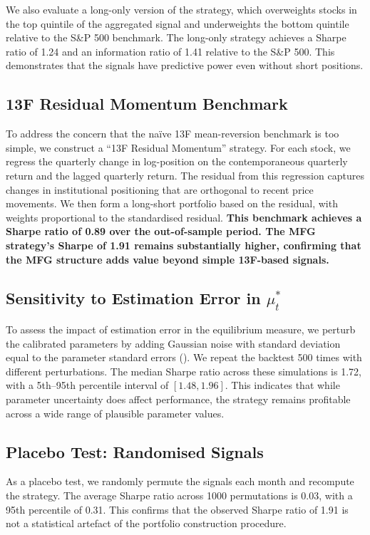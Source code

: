 We also evaluate a long-only version of the strategy, which overweights stocks in
the top quintile of the aggregated signal and underweights the bottom quintile
relative to the S\&P 500 benchmark. The long-only strategy achieves a Sharpe ratio
of 1.24 and an information ratio of 1.41 relative to the S\&P 500. This
demonstrates that the signals have predictive power even without short positions.

\subsection{13F Residual Momentum Benchmark}

To address the concern that the na\"ive 13F mean-reversion benchmark is too
simple, we construct a ``13F Residual Momentum'' strategy. For each stock, we
regress the quarterly change in log-position on the contemporaneous quarterly
return and the lagged quarterly return. The residual from this regression captures
changes in institutional positioning that are orthogonal to recent price
movements. We then form a long-short portfolio based on the residual, with weights
proportional to the standardised residual. \textbf{This benchmark achieves a
Sharpe ratio of 0.89 over the out-of-sample period. The MFG strategy's Sharpe of
1.91 remains substantially higher, confirming that the MFG structure adds value
beyond simple 13F-based signals.}

\subsection{Sensitivity to Estimation Error in $\mu_t^*$}

To assess the impact of estimation error in the equilibrium measure, we perturb
the calibrated parameters by adding Gaussian noise with standard deviation equal
to the parameter standard errors (). We repeat the
backtest 500 times with different perturbations. The median Sharpe ratio across
these simulations is 1.72, with a 5th--95th percentile interval of $[1.48, 1.96]$.
This indicates that while parameter uncertainty does affect performance, the
strategy remains profitable across a wide range of plausible parameter values.

\subsection{Placebo Test: Randomised Signals}

As a placebo test, we randomly permute the signals each month and recompute the
strategy. The average Sharpe ratio across 1000 permutations is 0.03, with a 95th
percentile of 0.31. This confirms that the observed Sharpe ratio of 1.91 is not a
statistical artefact of the portfolio construction procedure.


